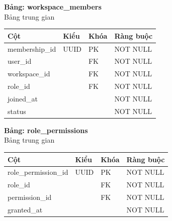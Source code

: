 \textbf{Bảng: workspace\_members}\\
Bảng trung gian
\begin{table}[H]
\centering
\begin{tabular}{|l|l|l|l|}
\hline
\textbf{Cột} & \textbf{Kiểu} & \textbf{Khóa} & \textbf{Ràng buộc} \\ \hline
membership\_id & UUID & PK & NOT NULL \\ \hline
user\_id & & FK & NOT NULL \\ \hline
workspace\_id & & FK & NOT NULL \\ \hline
role\_id & & FK & NOT NULL \\ \hline
joined\_at & & & NOT NULL \\ \hline
status & & & NOT NULL \\ \hline
\end{tabular}
\end{table}

\textbf{Bảng: role\_permissions}\\
Bảng trung gian
\begin{table}[H]
\centering
\begin{tabular}{|l|l|l|l|}
\hline
\textbf{Cột} & \textbf{Kiểu} & \textbf{Khóa} & \textbf{Ràng buộc} \\ \hline
role\_permission\_id & UUID & PK & NOT NULL \\ \hline
role\_id & & FK & NOT NULL \\ \hline
permission\_id & & FK & NOT NULL \\ \hline
granted\_at & & & NOT NULL \\ \hline
\end{tabular}
\end{table}
